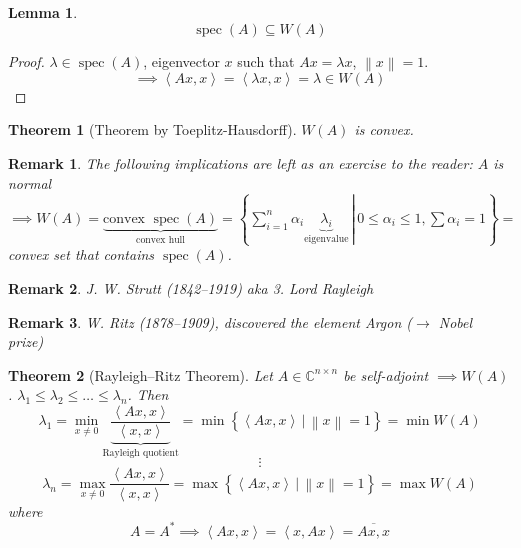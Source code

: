 \documentclass{article}
\newtheorem{theorem}{Theorem}  \numberwithin{theorem}{section}
\newtheorem{lemma}{Lemma}  \numberwithin{lemma}{section}
\newtheorem{remark}{Remark}  \numberwithin{remark}{section}
\newcommand{\setdef}[2]{\left\{\left.#1\,\right|\,#2\right\}}
\newcommand{\angel}[1]{\left\langle#1\right\rangle}
\newcommand{\norm}[1]{\left\|#1\right\|}
\begin{document}
\begin{lemma}
  \[ \operatorname{spec}(A) \subseteq W(A) \]
\end{lemma}
\begin{proof}
  $\lambda \in \operatorname{spec}(A)$, eigenvector $x$ such that $Ax = \lambda x$, $\norm{x} = 1$.
  \[ \implies \angel{Ax, x} = \angel{\lambda x, x} = \lambda \in W(A) \]
\end{proof}

\begin{theorem}[Theorem by Toeplitz-Hausdorff]
  $W(A)$ is convex.
\end{theorem}
\begin{remark}
  The following implications are left as an exercise to the reader:
  $A$ is normal $\implies W(A) = \underbrace{\text{convex } \operatorname{spec}(A)}_{\text{convex hull}} = \setdef{\sum_{i=1}^n \alpha_i \underbrace{\lambda_i}_{\text{eigenvalue}}}{0 \leq \alpha_i \leq 1, \sum \alpha_i = 1} =$ convex set that contains $\operatorname{spec}(A)$.
\end{remark}

\begin{remark}
  J. W. Strutt (1842--1919) aka 3. Lord Rayleigh
\end{remark}

\begin{remark}
  W. Ritz (1878--1909), discovered the element Argon ($\rightarrow$ Nobel prize)
\end{remark}

\begin{theorem}[Rayleigh--Ritz Theorem] %
  \label{rrthm}
  Let $A \in \mathbb C^{n \times n}$ be self-adjoint $\implies W(A)$.
  $\lambda_1 \leq \lambda_2 \leq \dots \leq \lambda_n$.
  Then
  \[ \lambda_1 = \min_{x \neq 0}\underbrace{\frac{\angel{Ax, x}}{\angel{x, x}}}_{\text{Rayleigh quotient}} = \min\setdef{\angel{Ax, x}}{\norm{x} = 1} = \min{W(A)} \]
  \[ \vdots \]
  \[ \lambda_n = \max_{x \neq 0}\frac{\angel{Ax, x}}{\angel{x, x}} = \max\setdef{\angel{Ax, x}}{\norm{x} = 1} = \max{W(A)} \]
  where
  \[ A = A^* \implies \angel{Ax, x} = \angel{x, Ax} = \overline{Ax, x} \]
\end{theorem}
\end{document}
